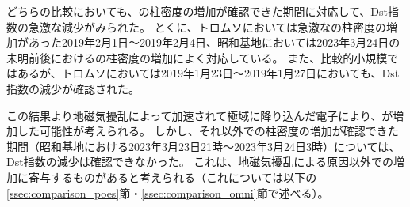 どちらの比較においても、の柱密度の増加が確認できた期間に対応して、Dst指数の急激な減少がみられた。
とくに、トロムソにおいては急激なの柱密度の増加があった2019年2月1日〜2019年2月4日、昭和基地においては2023年3月24日の未明前後におけるの柱密度の増加によく対応している。
また、比較的小規模ではあるが、トロムソにおいては2019年1月23日〜2019年1月27日においても、Dst指数の減少が確認された。\par

この結果より地磁気擾乱によって加速されて極域に降り込んだ電子により、が増加した可能性が考えられる。
しかし、それ以外での柱密度の増加が確認できた期間（昭和基地における2023年3月23日21時〜2023年3月24日3時）については、Dst指数の減少は確認できなかった。
これは、地磁気擾乱による原因以外での増加に寄与するものがあると考えられる（これについては以下の\ref{ssec:comparison_poes}節・\ref{ssec:comparison_omni}節で述べる）。


